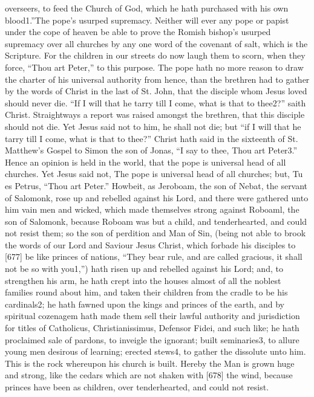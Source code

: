 overseers, to feed the Church of God, which he hath purchased with his own blood1.”The pope’s usurped supremacy. Neither will ever any pope or papist under the cope of heaven be able to prove the Romish bishop’s usurped supremacy over all churches by any one word of the covenant of salt, which is the Scripture. For the children in our streets do now laugh them to scorn, when they force, “Thou art Peter,” to this purpose. The pope hath no more reason to draw the charter of his universal authority from hence, than the brethren had to gather by the words of Christ in the last of St. John, that the disciple whom Jesus loved should never die. “If I will that he tarry till I come, what is that to thee2?” saith Christ. Straightways a report was raised amongst the brethren, that this disciple should not die. Yet Jesus said not to him, he shall not die; but “if I will that he tarry till I come, what is that to thee?” Christ hath said in the sixteenth of St. Matthew’s Gospel to Simon the son of Jonas, “I say to thee, Thou art Peter3.” Hence an opinion is held in the world, that the pope is universal head of all churches. Yet Jesus said not, The pope is universal head of all churches; but, Tu es Petrus, “Thou art Peter.” Howbeit, as Jeroboam, the son of Nebat, the servant of Salomonk, rose up and rebelled against his Lord, and there were gathered unto him vain men and wicked, which made themselves strong against Roboaml, the son of Salomonk, because Roboam was but a child, and tenderhearted, and could not resist them; so the son of perdition and Man of Sin, (being not able to brook the words of our Lord and Saviour Jesus Christ, which forbade his disciples to [677] be like princes of nations, “They bear rule, and are called gracious, it shall not be so with you1,”) hath risen up and rebelled against his Lord; and, to strengthen his arm, he hath crept into the houses almost of all the noblest families round about him, and taken their children from the cradle to be his cardinals2; he hath fawned upon the kings and princes of the earth, and by spiritual cozenagem hath made them sell their lawful authority and jurisdiction for titles of Catholicus, Christianissimus, Defensor Fidei, and such like; he hath proclaimed sale of pardons, to inveigle the ignorant; built seminaries3, to allure young men desirous of learning; erected stews4, to gather the dissolute unto him. This is the rock whereupon his church is built. Hereby the Man is grown huge and strong, like the cedars which are not shaken with [678] the wind, because princes have been as children, over tenderhearted, and could not resist.

